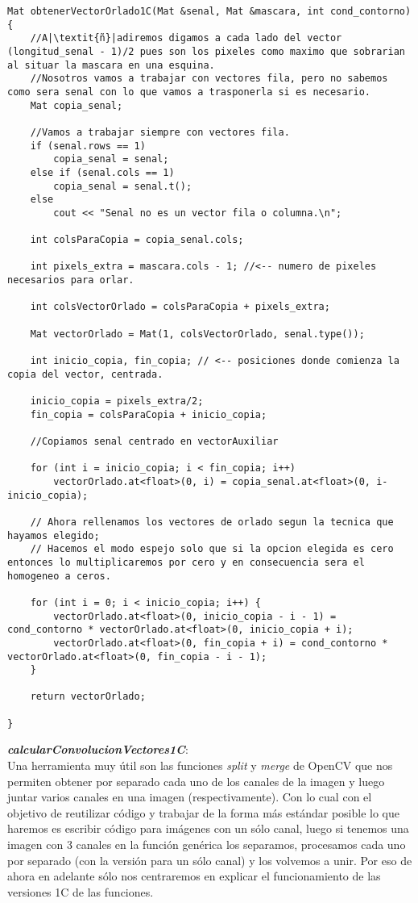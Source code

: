\documentclass[10pt,a4paper]{article}
\begin{document}
\begin{lstlisting}
Mat obtenerVectorOrlado1C(Mat &senal, Mat &mascara, int cond_contorno) {
	//A|\textit{ñ}|adiremos digamos a cada lado del vector (longitud_senal - 1)/2 pues son los pixeles como maximo que sobrarian al situar la mascara en una esquina.
	//Nosotros vamos a trabajar con vectores fila, pero no sabemos como sera senal con lo que vamos a trasponerla si es necesario.
	Mat copia_senal;

	//Vamos a trabajar siempre con vectores fila.
	if (senal.rows == 1)
		copia_senal = senal;
	else if (senal.cols == 1)
		copia_senal = senal.t();
	else
		cout << "Senal no es un vector fila o columna.\n";

	int colsParaCopia = copia_senal.cols;	
	
	int pixels_extra = mascara.cols - 1; //<-- numero de pixeles necesarios para orlar.

	int colsVectorOrlado = colsParaCopia + pixels_extra;

	Mat vectorOrlado = Mat(1, colsVectorOrlado, senal.type());

	int inicio_copia, fin_copia; // <-- posiciones donde comienza la copia del vector, centrada.

	inicio_copia = pixels_extra/2;
	fin_copia = colsParaCopia + inicio_copia;

	//Copiamos senal centrado en vectorAuxiliar

	for (int i = inicio_copia; i < fin_copia; i++)
		vectorOrlado.at<float>(0, i) = copia_senal.at<float>(0, i-inicio_copia);		
	
	// Ahora rellenamos los vectores de orlado segun la tecnica que hayamos elegido;
	// Hacemos el modo espejo solo que si la opcion elegida es cero entonces lo multiplicaremos por cero y en consecuencia sera el homogeneo a ceros.
	
	for (int i = 0; i < inicio_copia; i++) {
		vectorOrlado.at<float>(0, inicio_copia - i - 1) = cond_contorno * vectorOrlado.at<float>(0, inicio_copia + i);
		vectorOrlado.at<float>(0, fin_copia + i) = cond_contorno * vectorOrlado.at<float>(0, fin_copia - i - 1);
	}

	return vectorOrlado;

}
\end{lstlisting}

\textbf{\textit{calcularConvolucionVectores1C}}:\\

Una herramienta muy útil son las funciones \textit{split} y \textit{merge} de OpenCV que nos permiten obtener por separado cada uno de los canales de la imagen y luego juntar varios canales en una imagen (respectivamente). Con lo cual con el objetivo de reutilizar código y trabajar de la forma más estándar posible lo que haremos es escribir código para imágenes con un sólo canal, luego si tenemos una imagen con 3 canales en la función genérica los separamos, procesamos cada uno por separado (con la versión para un sólo canal) y los volvemos a unir. Por eso de ahora en adelante sólo nos centraremos en explicar el funcionamiento de las versiones 1C de las funciones.\\
\end{document}
